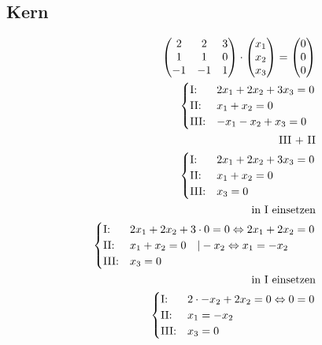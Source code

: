 \subsection*{Kern}
\begin{align*}
    \begin{pmatrix}
    2 & 2 & 3 \\ 1 & 1 & 0 \\ -1 & -1 & 1
\end{pmatrix} \cdot \begin{pmatrix}
    x_1 \\ x_2 \\ x_3
\end{pmatrix} = \begin{pmatrix}
    0 \\ 0 \\ 0
\end{pmatrix} \\\pagebreak[0]
\begin{cases}
    \text{I:\@} & 2x_1 + 2x_2 + 3x_3 = 0 \\
    \text{II:\@} & x_1 + x_2 = 0 \\
    \text{III:\@} & -x_1 - x_2 + x_3 = 0
\end{cases} \\\pagebreak[0]
\text{III + II} \\\pagebreak[0]
\begin{cases}
    \text{I:\@} & 2x_1 + 2x_2 + 3x_3 = 0 \\
    \text{II:\@} & x_1 + x_2 = 0 \\
    \text{III:\@} & x_3 = 0
\end{cases} \\
\text{in I einsetzen} \\\pagebreak[0]
\begin{cases}
    \text{I:\@} & 2x_1 + 2x_2 + 3 \cdot 0 = 0 \Leftrightarrow 2x_1 + 2x_2 = 0 \\
    \text{II:\@} & x_1 + x_2 = 0 \quad | -x_2 \Leftrightarrow x_1 = -x_2\\
    \text{III:\@} & x_3 = 0
\end{cases} \\\pagebreak[0]
\text{in I einsetzen} \\\pagebreak[0]
\begin{cases}
    \text{I:\@} & 2 \cdot -x_2 + 2x_2 = 0 \Leftrightarrow 0 = 0 \\
    \text{II:\@} & x_1 = -x_2\\
    \text{III:\@} & x_3 = 0
\end{cases} \\\pagebreak[0]

\end{align*}
